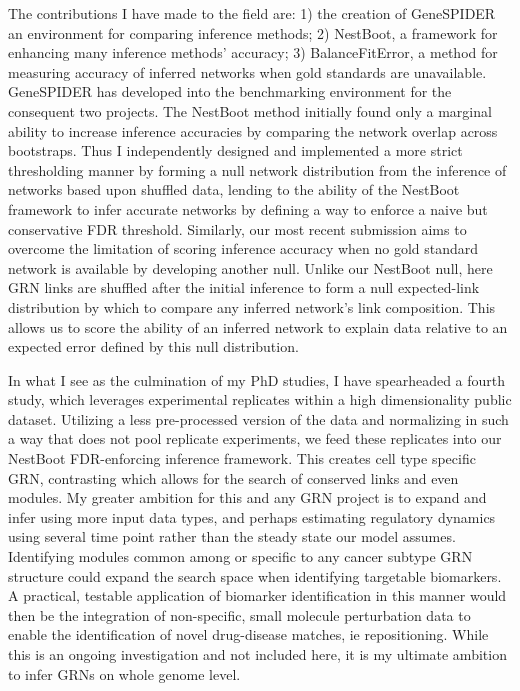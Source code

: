 The contributions I have made to the field are: 1) the creation of GeneSPIDER an environment for comparing inference methods; 2) NestBoot, a framework for enhancing many inference methods’ accuracy; 3) BalanceFitError, a method for measuring accuracy of inferred networks when gold standards are unavailable. GeneSPIDER has developed into the benchmarking environment for the consequent two projects. The NestBoot method initially found only a marginal ability to increase inference accuracies by comparing the network overlap across bootstraps. Thus I independently designed and implemented a more strict thresholding manner by forming a null network distribution from the inference of networks based upon shuffled data, lending to the ability of the NestBoot framework to infer accurate networks by defining a way to enforce a naive but conservative FDR threshold. Similarly, our most recent submission aims to overcome the limitation of scoring inference accuracy when no gold standard network is available by developing another null. Unlike our NestBoot null, here GRN links are shuffled after the initial inference to form a null expected-link distribution by which to compare any inferred network’s link composition. This allows us to score the ability of an inferred network to explain data relative to an expected error defined by this null distribution. 

In what I see as the culmination of my PhD studies, I have spearheaded a fourth study, which leverages experimental replicates within a high dimensionality public dataset. Utilizing a less pre-processed version of the data and normalizing in such a way that does not pool replicate experiments, we feed these replicates into our NestBoot FDR-enforcing inference framework. This creates cell type specific GRN, contrasting which allows for the search of conserved links and even modules. My greater ambition for this and any GRN project is to expand and infer using more input data types, and perhaps estimating regulatory dynamics using several time point rather than the steady state our model assumes. Identifying modules common among or specific to any cancer subtype GRN structure could expand the search space when identifying targetable biomarkers. A practical, testable application of biomarker identification in this manner would then be the integration of non-specific, small molecule perturbation data to enable the identification of novel drug-disease matches, ie repositioning. While this is an ongoing investigation and not included here, it is my ultimate ambition to infer GRNs on whole genome level.



